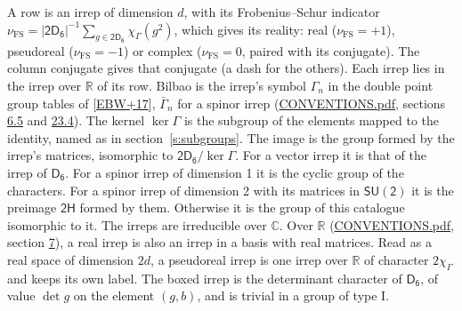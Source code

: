 \documentclass[10pt,a4paper]{article}
\numberwithin{equation}{section}
\newcommand{\grp}[1]{\mathsf{#1}}
\newcommand{\irchar}[1]{\chi_{#1}}
\newcommand{\fsind}{\nu_{\mathrm{FS}}}
\begin{document}
\leavevmode\label{n:index.frobenius}\label{n:head.irrep}\label{n:head.reality}A row is an irrep of dimension $d$, with its Frobenius--Schur indicator $\fsind = |\grp{2D_{6}}|^{-1}\allowbreak\sum_{g\in\grp{2D_{6}}}\irchar{\Gamma}(g^2)$, which gives its reality: real ($\fsind = +1$), pseudoreal ($\fsind = -1$) or complex ($\fsind = 0$, paired with its conjugate). \label{n:head.conjugate}The column conjugate gives that conjugate (a dash for the others). \label{n:head.over.real}Each irrep lies in the irrep over $\mathbb{R}$ of its row. \label{n:head.bilbao}\label{n:irrep.alias.gamma}Bilbao is the irrep's symbol $\Gamma_n$ in the double point group tables of [\href{../../../REFERENCES.pdf\#ref.EBW+17}{EBW+17}], $\bar{\Gamma}_n$ for a spinor irrep (\href{../../CONVENTIONS.pdf}{CONVENTIONS.pdf}, sections \href{../../../rotation/CONVENTIONS.pdf\#conv.6.5}{6.5} and \href{../../CONVENTIONS.pdf\#conv.23.4}{23.4}). \label{n:head.kernel}The kernel $\ker\Gamma$ is the subgroup of the elements mapped to the identity, named as in section~\ref{s:subgroups}. \label{n:head.image}The image is the group formed by the irrep's matrices, isomorphic to $\grp{2D_{6}}/\ker\Gamma$. For a vector irrep it is that of the irrep of \href{../../../rotation/data/pdf/D6.pdf}{$\grp{D_{6}}$}. For a spinor irrep of dimension 1 it is the cyclic group of the characters. For a spinor irrep of dimension 2 with its matrices in $\grp{SU(2)}$ it is the preimage $\grp{2H}$ formed by them. Otherwise it is the group of this catalogue isomorphic to it. The irreps are irreducible over $\mathbb{C}$. Over $\mathbb{R}$ (\href{../../CONVENTIONS.pdf}{CONVENTIONS.pdf}, section \href{../../../rotation/CONVENTIONS.pdf\#conv.7}{7}), a real irrep is also an irrep in a basis with real matrices. Read as a real space of dimension $2d$, a pseudoreal irrep is one irrep over $\mathbb{R}$ of character $2\irchar{\Gamma}$ and keeps its own label. \label{n:mark.determinant}The boxed irrep is the determinant character of \href{../../../rotation/data/pdf/D6.pdf}{$\grp{D_{6}}$}, of value $\det g$ on the element $(g, b)$, and is trivial in a group of type I.
\setlength{\emergencystretch}{2em}\par\setlength{\emergencystretch}{0pt}
\end{document}
